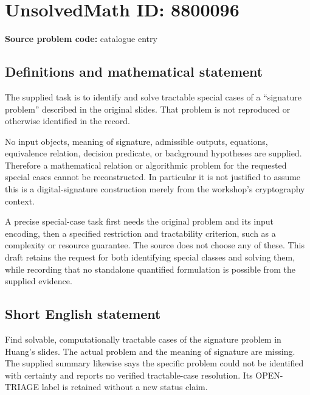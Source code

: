 \documentclass[11pt]{article}
\begin{document}
\section*{UnsolvedMath ID: 8800096}
\textbf{Source problem code:} catalogue entry
\subsection{Definitions and mathematical statement}
The supplied task is to identify and solve tractable special cases of a ``signature problem'' described in the original slides. That problem is not reproduced or otherwise identified in the record.

No input objects, meaning of signature, admissible outputs, equations, equivalence relation, decision predicate, or background hypotheses are supplied. Therefore a mathematical relation or algorithmic problem for the requested special cases cannot be reconstructed. In particular it is not justified to assume this is a digital-signature construction merely from the workshop's cryptography context.

A precise special-case task first needs the original problem and its input encoding, then a specified restriction and tractability criterion, such as a complexity or resource guarantee. The source does not choose any of these. This draft retains the request for both identifying special classes and solving them, while recording that no standalone quantified formulation is possible from the supplied evidence.
\subsection{Short English statement}
Find solvable, computationally tractable cases of the signature problem in Huang's slides. The actual problem and the meaning of signature are missing. The supplied summary likewise says the specific problem could not be identified with certainty and reports no verified tractable-case resolution. Its OPEN-TRIAGE label is retained without a new status claim.
\end{document}
